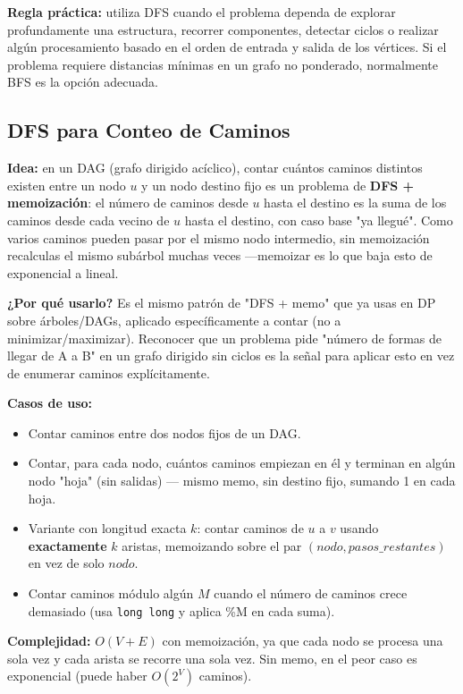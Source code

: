 \documentclass[10pt,a4paper,twocolumn]{article}
\begin{document}
\textbf{Regla práctica:} utiliza DFS cuando el problema dependa de
explorar profundamente una estructura, recorrer componentes, detectar
ciclos o realizar algún procesamiento basado en el orden de entrada y
salida de los vértices. Si el problema requiere distancias mínimas en
un grafo no ponderado, normalmente BFS es la opción adecuada.

\subsection{DFS para Conteo de Caminos}

\textbf{Idea:} en un DAG (grafo dirigido acíclico), contar cuántos
caminos distintos existen entre un nodo $u$ y un nodo destino fijo
es un problema de \textbf{DFS + memoización}: el número de caminos
desde $u$ hasta el destino es la suma de los caminos desde cada
vecino de $u$ hasta el destino, con caso base "ya llegué". Como
varios caminos pueden pasar por el mismo nodo intermedio, sin
memoización recalculas el mismo subárbol muchas veces —memoizar es
lo que baja esto de exponencial a lineal.

\textbf{¿Por qué usarlo?} Es el mismo patrón de "DFS + memo" que ya
usas en DP sobre árboles/DAGs, aplicado específicamente a contar
(no a minimizar/maximizar). Reconocer que un problema pide "número
de formas de llegar de A a B" en un grafo dirigido sin ciclos es la
señal para aplicar esto en vez de enumerar caminos explícitamente.

\textbf{Casos de uso:}

\begin{itemize}
	\item Contar caminos entre dos nodos fijos de un DAG.
	\item Contar, para cada nodo, cuántos caminos empiezan en él y
	terminan en algún nodo "hoja" (sin salidas) — mismo memo, sin
	destino fijo, sumando 1 en cada hoja.
	\item Variante con longitud exacta $k$: contar caminos de $u$ a
	$v$ usando \textbf{exactamente} $k$ aristas, memoizando sobre el
	par $(nodo, pasos\_restantes)$ en vez de solo $nodo$.
	\item Contar caminos módulo algún $M$ cuando el número de
	caminos crece demasiado (usa \texttt{long long} y aplica \%M en
	cada suma).
\end{itemize}

\textbf{Complejidad:} $O(V + E)$ con memoización, ya que cada nodo
se procesa una sola vez y cada arista se recorre una sola vez. Sin
memo, en el peor caso es exponencial (puede haber $O(2^V)$ caminos).
\end{document}
